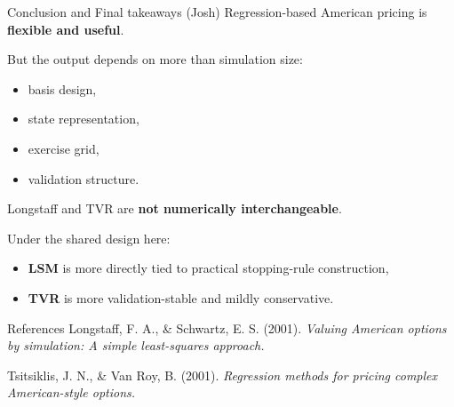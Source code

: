 \documentclass[
  11pt,
  ignorenonframetext,
  aspectratio=169,
]{beamer}
\providecommand{\tightlist}{%
  \setlength{\itemsep}{0pt}\setlength{\parskip}{0pt}}
\begin{document}
\begin{frame}{Conclusion and Final takeaways (Josh)}
\label{conclusion-and-final-takeaways-josh}
Regression-based American pricing is \textbf{flexible and useful}.

But the output depends on more than simulation size:

\begin{itemize}
\tightlist
\item
  basis design,
\item
  state representation,
\item
  exercise grid,
\item
  validation structure.
\end{itemize}

Longstaff and TVR are \textbf{not numerically interchangeable}.

Under the shared design here:

\begin{itemize}
\tightlist
\item
  \textbf{LSM} is more directly tied to practical stopping-rule
  construction,
\item
  \textbf{TVR} is more validation-stable and mildly conservative.
\end{itemize}
\end{frame}

\begin{frame}{References}
\label{references}
Longstaff, F. A., \& Schwartz, E. S. (2001). \emph{Valuing American
options by simulation: A simple least-squares approach.}

Tsitsiklis, J. N., \& Van Roy, B. (2001). \emph{Regression methods for
pricing complex American-style options.}
\end{frame}
\end{document}
